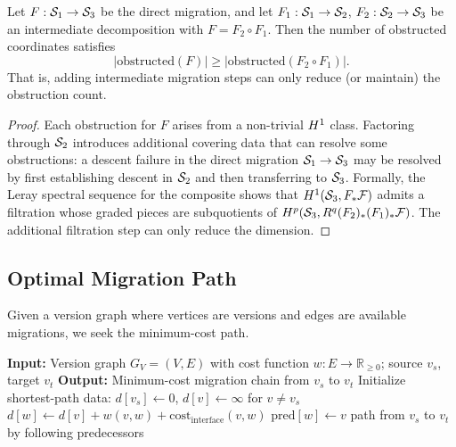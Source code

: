 \documentclass[11pt]{article}
\newcommand{\FunctorF}{F}
\newcommand{\MigCost}{\mathrm{cost}}
\begin{document}
\begin{proposition}\label{prop:monotonicity}
Let $\FunctorF : \Site_1 \to \Site_3$ be the direct migration, and let
$\FunctorF_1 : \Site_1 \to \Site_2$, $\FunctorF_2 : \Site_2 \to \Site_3$
be an intermediate decomposition with $\FunctorF = \FunctorF_2 \circ
\FunctorF_1$.  Then the number of obstructed coordinates satisfies
\[
  |\mathrm{obstructed}(\FunctorF)| \geq
    |\mathrm{obstructed}(\FunctorF_2 \circ \FunctorF_1)|.
\]
That is, adding intermediate migration steps can only reduce (or maintain)
the obstruction count.
\end{proposition}

\begin{proof}
Each obstruction for $\FunctorF$ arises from a non-trivial
$H^{1}$ class.  Factoring through $\mathcal{S}_2$ introduces additional
covering data that can resolve some obstructions: a descent failure in the
direct migration $\mathcal{S}_1 \to \mathcal{S}_3$ may be resolved by first establishing
descent in $\mathcal{S}_2$ and then transferring to $\mathcal{S}_3$.  Formally, the
Leray spectral sequence for the composite shows that
$\Hcoh{1}(\Site_3, \FunctorF_*\mathcal{F})$ admits a filtration whose
graded pieces are subquotients of
$\Hcoh{p}(\Site_3, R^q(\FunctorF_2)_*(\FunctorF_1)_*\mathcal{F})$.
The additional filtration step can only reduce the dimension.
\end{proof}

\subsection{Optimal Migration Path}

Given a version graph where vertices are versions and edges are available
migrations, we seek the minimum-cost path.

\begin{algorithm}[H]
\caption{Optimal Migration Path}
\label{alg:optimal-path}
\begin{algorithmic}[1]
\STATE \textbf{Input:} Version graph $G_V = (V, E)$ with cost function $w : E \to \mathbb{R}_{\geq 0}$; source $v_s$, target $v_t$
\STATE \textbf{Output:} Minimum-cost migration chain from $v_s$ to $v_t$
\STATE Initialize shortest-path data: $d[v_s] \gets 0$, $d[v] \gets \infty$ for $v \neq v_s$
    \IF{$d[v] + w(v,w) + \MigCost_{\mathrm{interface}}(v, w) < d[w]$}
      \STATE $d[w] \gets d[v] + w(v,w) + \MigCost_{\mathrm{interface}}(v,w)$
      \STATE $\mathrm{pred}[w] \gets v$
    \ENDIF
  \ENDFOR
\ENDFOR
\RETURN path from $v_s$ to $v_t$ by following predecessors
\end{algorithmic}
\end{algorithm}
\end{document}
